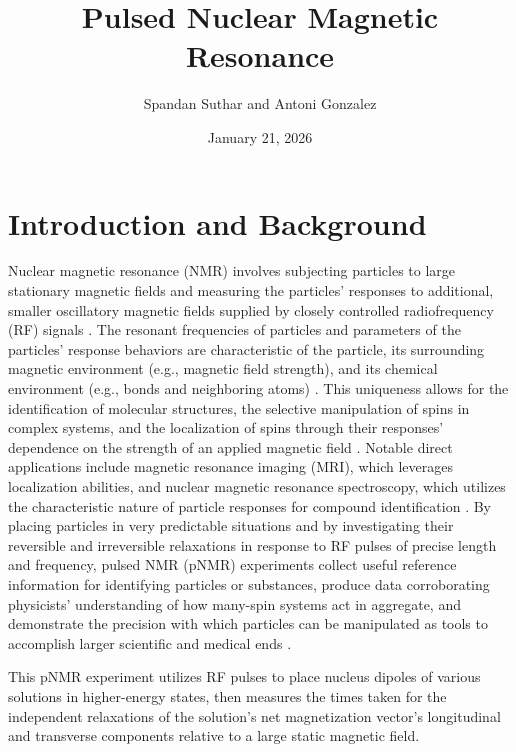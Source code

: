 \documentclass[11pt]{article}
\title{Pulsed Nuclear Magnetic Resonance}
\author{Spandan Suthar and Antoni Gonzalez}
\date{January 21, 2026}
\begin{document}
\maketitle

\section{Introduction and Background}

Nuclear magnetic resonance (NMR) involves subjecting particles to
large stationary magnetic
fields and measuring the particles' responses to additional, smaller
oscillatory magnetic fields supplied by closely controlled
radiofrequency (RF) signals \cite{mel}. The
resonant frequencies of particles
and parameters of the particles'
response behaviors are characteristic of the particle, its
surrounding magnetic
environment (e.g., magnetic field strength), and its chemical
environment (e.g., bonds and neighboring atoms) \cite{spect, harris, mel}.
This uniqueness allows for the identification of molecular structures,
the selective manipulation of spins in complex systems, and
the localization of spins through their responses'
dependence on the strength of an applied magnetic
field \cite{spect, harris, mel}. Notable direct applications include
magnetic resonance
imaging (MRI), which leverages localization abilities, and nuclear
magnetic resonance spectroscopy, which utilizes
the characteristic nature
of particle responses for compound identification \cite{spect,
harris, mel}. By placing
particles in very predictable situations and by
investigating their reversible and irreversible relaxations
in response to RF pulses of precise length and frequency, pulsed NMR
(pNMR) experiments collect useful reference
information for identifying particles or substances, produce data
corroborating physicists'
understanding of how
many-spin systems act in aggregate, and demonstrate the precision with which
particles can be manipulated as tools to accomplish larger scientific
and medical ends \cite{mel}.

This pNMR experiment utilizes RF pulses to place
nucleus dipoles of various solutions in higher-energy states, then
measures the times taken for the independent relaxations of the
solution's net magnetization vector's longitudinal and transverse
components relative to a large static magnetic field.
\end{document}

